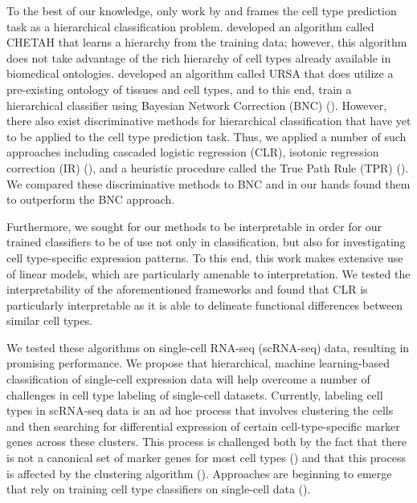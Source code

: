 To the best of our knowledge, only work by  \cite{Kanter2019} and \cite{Lee2013} frames the cell type prediction task as a hierarchical classification problem.  \cite{Kanter2019} developed an algorithm called CHETAH that learns a hierarchy from the training data; however, this algorithm does not take advantage of the rich hierarchy of cell types already available in biomedical ontologies.  \cite{Lee2013} developed an algorithm called URSA that does utilize a pre-existing ontology of tissues and cell types, and to this end, train a hierarchical classifier using Bayesian Network Correction (BNC) (\citealp{BarutcuogluSchapireTroyanskaya2006}). However, there also exist discriminative methods for hierarchical classification that have yet to be applied to the cell type prediction task. Thus, we applied a number of such approaches including cascaded logistic regression (CLR), isotonic regression correction (IR) (\citealp{Obozinski2008}), and a heuristic procedure called the True Path Rule (TPR) (\citealp{Notaro2017}). We compared these discriminative methods to BNC and in our hands found them to outperform the BNC approach.

Furthermore, we sought for our methods to be interpretable in order for our trained classifiers to be of use not only in classification, but also for investigating cell type-specific expression patterns. To this end, this work makes extensive use of linear models, which are particularly amenable to interpretation. We tested the interpretability of the aforementioned frameworks and found that CLR is particularly interpretable as it is able to delineate functional differences between similar cell types.

We tested these algorithms on single-cell RNA-seq (scRNA-seq) data, resulting in promising performance. We propose that hierarchical, machine learning-based classification of single-cell expression data will help overcome a number of challenges in cell type labeling of single-cell datasets.  Currently, labeling cell types in scRNA-seq data is an ad hoc process that involves clustering the cells and then searching for differential expression of certain cell-type-specific marker genes across these clusters. This process is challenged both by the fact that there is not a canonical set of marker genes for most cell types (\citealp{Zhang2018}) and that this process is affected by the clustering algorithm (\citealp{Kiselev2019}). Approaches are beginning to emerge that rely on training cell type classifiers on single-cell data (\citealp{Xie2019, Alavi2018}).  

